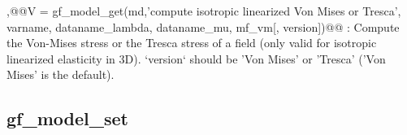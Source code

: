 \begin{cmddescription}
\sep{@@V = gf_model_get(md,'compute isotropic linearized Von Mises or Tresca', \tstr varname, \tstr dataname_lambda, \tstr dataname_mu, \tmf mf_vm[, \tstr version])@@} :
Compute the Von-Mises stress or the Tresca stress of a field
(only valid for isotropic linearized elasticity in 3D).
`version` should be  'Von Mises' or 'Tresca' ('Von Mises' is the default).


\end{cmddescription}
\newpage

\subsection{gf\_model_set}
